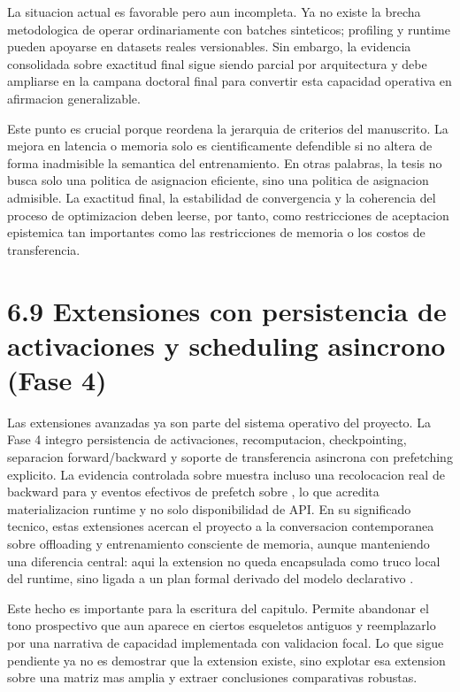 La situacion actual es favorable pero aun incompleta. Ya no existe la brecha metodologica de operar ordinariamente con batches sinteticos; profiling y runtime pueden apoyarse en datasets reales versionables. Sin embargo, la evidencia consolidada sobre exactitud final sigue siendo parcial por arquitectura y debe ampliarse en la campana doctoral final para convertir esta capacidad operativa en afirmacion generalizable.

Este punto es crucial porque reordena la jerarquia de criterios del manuscrito. La mejora en latencia o memoria solo es cientificamente defendible si no altera de forma inadmisible la semantica del entrenamiento. En otras palabras, la tesis no busca solo una politica de asignacion eficiente, sino una politica de asignacion admisible. La exactitud final, la estabilidad de convergencia y la coherencia del proceso de optimizacion deben leerse, por tanto, como restricciones de aceptacion epistemica tan importantes como las restricciones de memoria o los costos de transferencia.

\section{6.9 Extensiones con persistencia de activaciones y scheduling asincrono (Fase 4)}
Las extensiones avanzadas ya son parte del sistema operativo del proyecto. La Fase 4 integro persistencia de activaciones, recomputacion, checkpointing, separacion forward/backward y soporte de transferencia asincrona con prefetching explicito. La evidencia controlada sobre  muestra incluso una recolocacion real de backward para  y eventos efectivos de prefetch sobre , lo que acredita materializacion runtime y no solo disponibilidad de API. En su significado tecnico, estas extensiones acercan el proyecto a la conversacion contemporanea sobre offloading y entrenamiento consciente de memoria, aunque manteniendo una diferencia central: aqui la extension no queda encapsulada como truco local del runtime, sino ligada a un plan formal derivado del modelo declarativo \cite{chen2016sublinear,rajbhandari2020zero,ren2021zerooffload}.

Este hecho es importante para la escritura del capitulo. Permite abandonar el tono prospectivo que aun aparece en ciertos esqueletos antiguos y reemplazarlo por una narrativa de capacidad implementada con validacion focal. Lo que sigue pendiente ya no es demostrar que la extension existe, sino explotar esa extension sobre una matriz mas amplia y extraer conclusiones comparativas robustas.

